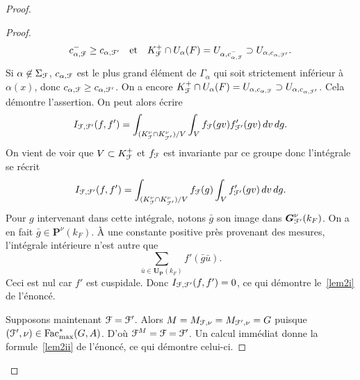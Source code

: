 \documentclass[11pt]{article}
\numberwithin{equation}{section}\providecommand{\og}{«\,}\providecommand{\fg}{\,»}
\let\mathcal \EuScript
\newcommand{\quadet}{\quad\text{et}\quad}
\newcommand{\Fac}{\mathrm{Fac}}
\newcommand{\bG}{\boldsymbol{G}}
\newcommand{\bP}{\boldsymbol{P}}
\newcommand{\bU}{\boldsymbol{U}}
\newcommand{\cF}{\mathcal{F}}
\theoremstyle{plain}
\theoremstyle{definition}
\begin{document}
\begin{proof}
\begin{proof}
\[
c_{\alpha,\cF}^-\geq c_{\alpha,\cF'}\quadet K_{\cF}^+\cap U_{\alpha}(F)=U_{\alpha,c_{\alpha,\cF}^-}\supset U_{\alpha,c_{\alpha,\cF'}}.
\]
Si $\alpha\not\in \Sigma_{\cF}$, $c_{\alpha,\cF}$ est le plus grand élément de $\Gamma_{\alpha}$ qui soit strictement inférieur à $\alpha(x)$, donc $c_{\alpha,\cF}\geq c_{\alpha,\cF'}$. On a encore $K_{\cF}^+\cap U_{\alpha}(F)=U_{\alpha,c_{\alpha,\cF}}\supset U_{\alpha,c_{\alpha,\cF'}}$. Cela démontre l'assertion. On peut alors écrire
\[
I_{\cF,\cF'}(f,f')=\int_{(K_{\cF}^{\nu}\cap K_{\cF'}^{\nu})/V}\int_{V}f_{\cF}(gv)f'_{\cF'}(gv)\, dv\, dg.
\]
On vient de voir que $V\subset K_{\cF}^+$ et $f_{\cF}$ est invariante par ce groupe donc l'intégrale se récrit
\[
I_{\cF,\cF'}(f,f')=\int_{(K_{\cF}^{\nu}\cap K_{\cF'}^{\nu})/V}f_{\cF}(g)\int_{V}f'_{\cF'}(gv)\, dv\, dg.
\]
Pour $g$ intervenant dans cette intégrale, notons $\bar{g}$ son image dans $\bG^{\nu}_{\cF'}(k_{F})$. On a en fait $\bar{g}\in \bP^{\nu}(k_{F})$. À une constante positive près provenant des mesures, l'intégrale intérieure n'est autre que
\[
\sum_{\bar{u}\in \bU_{\bP}(k_{F})}f'(\bar{g}\bar{ u}).
\]
Ceci est nul car $f'$ est cuspidale. Donc $I_{\cF,\cF'}(f,f')=0$, ce qui démontre le~\eqref{lem2i} de l'énoncé.

Supposons maintenant $\cF=\cF'$. Alors $M=M_{\cF,\nu}=M_{\cF',\nu}=G$ puisque $(\cF',\nu)\in \Fac^*_{\max}(G,A)$. D'où $\cF^M=\cF=\cF'$. Un calcul immédiat donne
la formule~\eqref{lem2ii} de l'énoncé, ce qui démontre celui-ci.
\end{proof}


\end{proof}
\end{document}

